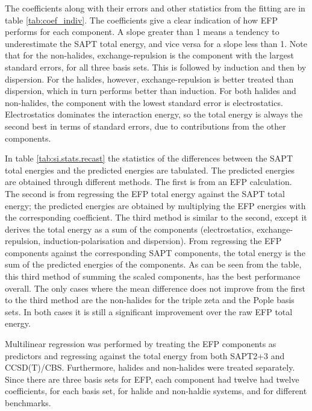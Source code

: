 \begin{multicols}{2}

The coefficients along with their errors and other statistics from the fitting are in table 
\ref{tab:coef_indiv}.
The coefficients give a clear indication of how EFP performs for each component.
A slope greater than 1 means a tendency to underestimate the SAPT total energy, and vice versa for a slope less than 1. 
Note that for the non-halides, exchange-repulsion is the component with the largest standard errors, for all three basis sets.
This is followed by induction and then by dispersion.
For the halides, however, exchange-repulsion is better treated than dispersion, which in turn performs better than induction.
For both halides and non-halides, the component with the lowest standard error is electrostatics. 
Electrostatics dominates the interaction energy, so the total energy is always the second best in terms of standard errors, due to contributions from the other components.

In table 
\ref{tab:si.stats.recast}
the statistics of the differences between the SAPT total energies and the predicted energies are tabulated.
The predicted energies are obtained through different methods. 
The first is from an EFP calculation.
The second is from regressing the EFP total energy against the SAPT total energy; the predicted energies are obtained by multiplying the EFP energies with the corresponding coefficient.
The third method is similar to the second, except it derives the total energy as a sum of the components (electrostatics, exchange-repulsion, induction-polarisation and dispersion).
From regressing the EFP components against the corresponding SAPT components, the total energy is the sum of the predicted energies of the components.
As can be seen from the table, this third method of summing the scaled components, has the best performance overall.
The only cases where the mean difference does not improve from the first to the third method are the non-halides for the triple zeta and the Pople basis sets.
In both cases it is still a significant improvement over the raw EFP total energy.



Multilinear regression was performed by treating the EFP components as predictors and regressing against the total energy from both SAPT2+3 and CCSD(T)/CBS.
Furthermore, halides and non-halides were treated separately.
Since there are three basis sets for EFP, each component had twelve had twelve coefficients, for each basis set, for halide and non-haldie systems, and for different benchmarks.



\end{multicols}
